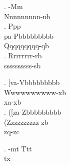 \ex. \gll -Mm \\
          Nnnnnnnnn-nb \\

\ex. \glll Ppp \\
           pa-Pbbbbbbbbb \\
           Qqqqqqqqq-qb \\

{%
\ex. \gll Rrrrrrrr-rb \\
          ssssssssss-sb \\

}

{\GlossPhantomAlign
\ex. \glll [va-Vbbbbbbbbb \\
           Wwwwwwwwww-xb \\
           xa-xb \\

\ex. \glll ([za-Zbbbbbbbbb \\
           (Zzzzzzzzzz-zb \\
           zq-zc \\

}

\ex. \gll {}-mt Ttt \\
           tx \\

